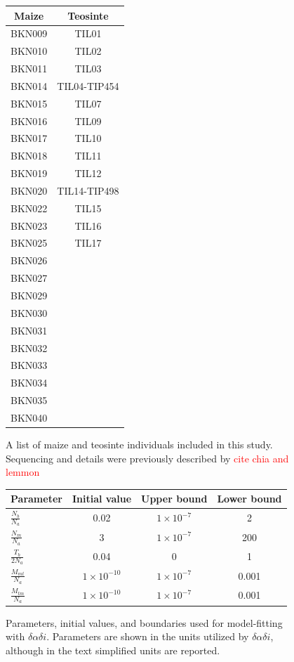 \documentclass{pnastwo}
\newcommand{\jri}[1]{\textcolor{red}{\scriptsize #1}}
\begin{document}
\begin{article}
\begin{figure}
  \begin{tabular}{c|c}
    \bf Maize & \bf Teosinte \\ \hline \hline
    BKN009 &  TIL01 \\
    BKN010 & TIL02 \\
    BKN011 & TIL03 \\
    BKN014 & TIL04-TIP454 \\
    BKN015 & TIL07 \\
    BKN016 & TIL09 \\
    BKN017 & TIL10 \\
    BKN018 & TIL11 \\
    BKN019 & TIL12 \\
    BKN020 & TIL14-TIP498 \\
    BKN022 & TIL15 \\
    BKN023 & TIL16 \\
    BKN025 & TIL17 \\
    BKN026 & \\
    BKN027 & \\
    BKN029 & \\
    BKN030 & \\
    BKN031 & \\
    BKN032 & \\
    BKN033 & \\
    BKN034 & \\
    BKN035 & \\
    BKN040 & \\
  \end{tabular} 
  \caption{ A list of maize and teosinte individuals included in this study. Sequencing and details were previously described by \jri{cite chia and lemmon}   \label{sTab:list} }
\end{figure}
\clearpage

\begin{figure}
  \def\arraystretch{2}
  \begin{tabular}{l|c|c|c}
    \bf Parameter & \bf Initial value & \bf Upper bound & \bf Lower bound\\ \hline 
    $\frac{N_b}{N_a}$ & 0.02 & $1\times10^{-7}$ & 2 \\ 
    $\frac{N_{m}}{N_a}$ & 3 & $1\times10^{-7}$ & 200 \\
    $\frac{T_b}{2N_a}$ & 0.04 & 0  & 1 \\ 
    $\frac{M_{mt}}{N_a}$ & $1\times10^{-10}$ & $1\times10^{-7}$ & 0.001 \\
    $\frac{M_{tm}}{N_a}$ & $1\times10^{-10}$ & $1\times10^{-7}$ & 0.001 \\
  \end{tabular} 
  \caption{ Parameters, initial values, and boundaries used for model-fitting with $\delta\alpha\delta{i}$. Parameters are shown in the units utilized by $\delta\alpha\delta{i}$, although in the text simplified units are reported.   \label{sTab:dadi} }
    \def\arraystretch{1} \end{figure}
\clearpage



\DIFdelbegin 
\DIFdelend \end{article}
\DIFaddbegin 


 \DIFaddend
\end{document}
